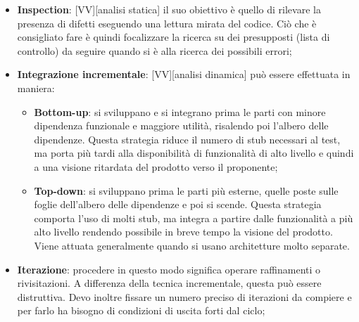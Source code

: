 \begin{itemize}
	\item \textbf{Inspection}: [VV][analisi statica] il suo obiettivo è quello di rilevare la presenza di difetti eseguendo una lettura mirata del codice. Ciò che è consigliato fare è quindi focalizzare la ricerca su dei presupposti (lista di controllo) da seguire quando si è alla ricerca dei possibili errori;

	\item \textbf{Integrazione incrementale}: [VV][analisi dinamica] può essere effettuata in maniera:
		\begin{itemize}
			\item \textbf{Bottom-up}: si sviluppano e si integrano prima le parti con minore dipendenza funzionale e maggiore utilità, risalendo poi l'albero delle dipendenze. Questa strategia riduce il numero di stub necessari al test, ma porta più tardi alla disponibilità di funzionalità di alto livello e quindi a una visione ritardata del prodotto verso il proponente;
			\item \textbf{Top-down}: si sviluppano prima le parti più esterne, quelle poste sulle foglie dell'albero delle dipendenze e poi si scende. Questa strategia comporta l'uso di molti stub, ma integra a partire dalle funzionalità a più alto livello rendendo possibile in breve tempo la visione del prodotto. Viene attuata generalmente quando si usano architetture molto separate.
		\end{itemize}

	\item \textbf{Iterazione}: procedere in questo modo significa operare raffinamenti o rivisitazioni. A differenza della tecnica incrementale, questa può essere distruttiva. \newline
Devo inoltre fissare un numero preciso di iterazioni da compiere e per farlo ha bisogno di condizioni di uscita forti dal ciclo;

\end{itemize}